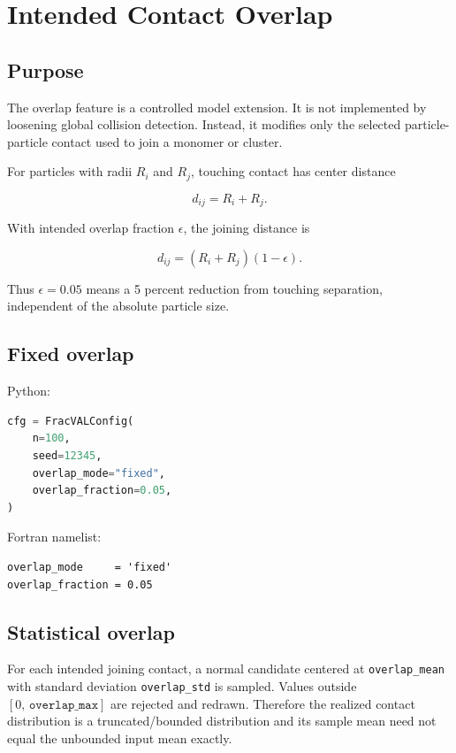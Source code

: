 \documentclass[11pt,oneside]{report}
\newcommand{\code}[1]{\texttt{#1}}
\begin{document}
\chapter{Intended Contact Overlap}\label{chap:overlap}

\section{Purpose}

The overlap feature is a controlled model extension. It is not implemented by
loosening global collision detection. Instead, it modifies only the selected
particle-particle contact used to join a monomer or cluster.

For particles with radii \(R_i\) and \(R_j\), touching contact has center
distance

\begin{equation}
d_{ij}=R_i+R_j.
\end{equation}

With intended overlap fraction \(\epsilon\), the joining distance is

\begin{equation}
d_{ij}=(R_i+R_j)(1-\epsilon).
\end{equation}

Thus \(\epsilon=0.05\) means a 5 percent reduction from touching separation,
independent of the absolute particle size.

\section{Fixed overlap}

Python:

\begin{lstlisting}[language=Python]
cfg = FracVALConfig(
    n=100,
    seed=12345,
    overlap_mode="fixed",
    overlap_fraction=0.05,
)
\end{lstlisting}

Fortran namelist:

\begin{lstlisting}
overlap_mode     = 'fixed'
overlap_fraction = 0.05
\end{lstlisting}

\section{Statistical overlap}

For each intended joining contact, a normal candidate centered at
\code{overlap\_mean} with standard deviation \code{overlap\_std} is sampled.
Values outside \([0,\,\code{overlap\_max}]\) are rejected and redrawn. Therefore
the realized contact distribution is a truncated/bounded distribution and its
sample mean need not equal the unbounded input mean exactly.
\end{document}
